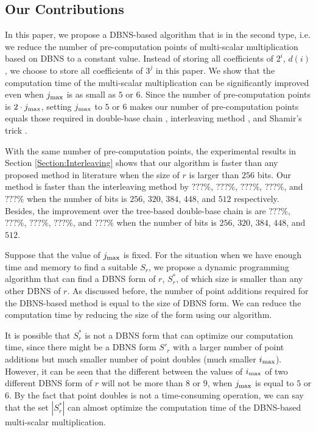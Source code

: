 \subsection{Our Contributions}

In this paper, we propose a DBNS-based algorithm that is in the second type, i.e. we reduce the number of pre-computation points of multi-scalar multiplication based on DBNS to a constant value. Instead of storing all coefficients of $2^i$, $d(i)$, we choose to store all coefficients of $3^j$ in this paper. We show that the computation time of the multi-scalar multiplication can be significantly improved even when $j_{\rm max}$ is as small as $5$ or $6$. Since the number of pre-computation points is $2 \cdot j_{\rm max}$, setting $j_{\rm max}$ to $5$ or $6$ makes our number of pre-computation points equals those required in double-base chain \cite{experiment,dbc1}, interleaving method \cite{interleaving}, and Shamir's trick \cite{enlarged4}.

With the same number of pre-computation points, the experimental results in Section \ref{Section:Interleaving} shows that our algorithm is faster than any proposed method in literature when the size of $r$ is larger than $256$ bits. Our method is faster than the interleaving method by $???\%$, $???\%$, $???\%$, $???\%$, and $???\%$ when the number of bits is $256$, $320$, $384$, $448$, and $512$ respectively. Besides, the improvement over the tree-based double-base chain is are  $???\%$, $???\%$, $???\%$, $???\%$, and $???\%$ when the number of bits is $256$, $320$, $384$, $448$, and $512$.

Suppose that the value of $j_{\rm max}$ is fixed. For the situation when we have enough time and memory to find a suitable $S_r$, we propose a dynamic programming algorithm that can find a DBNS form of $r$, $S^*_r$, of which size is smaller than any other DBNS of $r$. As discussed before, the number of point additions required for the DBNS-based method is equal to the size of DBNS form. We can reduce the computation time by reducing the size of the form using our algorithm.

It is possible that $S^*_r$ is not a DBNS form that can optimize our computation time, since there might be a DBNS form $S'_r$ with a larger number of point additions but much smaller number of point doubles (much smaller $i_{\rm max}$). However, it can be seen that the different between the values of $i_{\rm max}$ of two different DBNS form of $r$ will not be more than $8$ or $9$, when $j_{\rm max}$ is equal to $5$ or $6$. By the fact that point doubles is not a time-consuming operation, we can say that the set $|S^*_r|$ can almost optimize the computation time of the DBNS-based multi-scalar multiplication.

